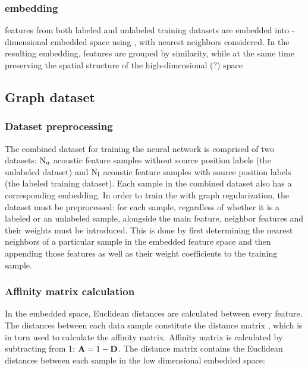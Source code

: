 \documentclass[applsci,article,submit,moreauthors,pdftex]{Definitions/mdpi}
\begin{document}
\subsubsection{\isomap{} embedding}
\srpphat{} features from both labeled and unlabeled training datasets are embedded into \Demb-dimensional embedded space using \isomap{}, with \kemb{} nearest neighbors considered. 
In the resulting embedding, \srpphat{} features are grouped by similarity, while at the same time preserving the spatial structure of the high-dimensional (?) space

\subsection{Graph dataset} \label{subsec:graphdataset}

\subsubsection{Dataset preprocessing}
The combined dataset for training the neural network is comprised of two datasets: $ \mathrm{N}_{\mathrm{u}} $ acoustic feature samples without source position labels (the unlabeled dataset) and $ \mathrm{N}_{\mathrm{l}} $ acoustic feature samples with source position labels (the labeled training dataset). Each sample in the combined dataset also has a corresponding \isomap{} embedding.
In order to train the \grnn{} with graph regularization, the dataset must be preprocessed: for each sample, regardless of whether it is a labeled or an unlabeled sample, alongside the main feature, neighbor features and their weights must be introduced. This is done by first determining the \gnbrs{} nearest neighbors of a particular sample in the embedded feature space and then appending those features as well as their weight coefficients to the training sample.

\subsubsection{Affinity matrix calculation}
In the embedded space, Euclidean distances are calculated between every feature. The distances between each data sample constitute the distance matrix \distancematrix, which is in turn used to calculate the affinity matrix.
Affinity matrix \affinitymatrix{} is calculated by subtracting \distancematrix{} from 1: $ \mathbf{A} = 1 - \mathbf{D} $. The distance matrix contains the Euclidean distances between each sample in the low dimensional embedded space:
\end{document}
